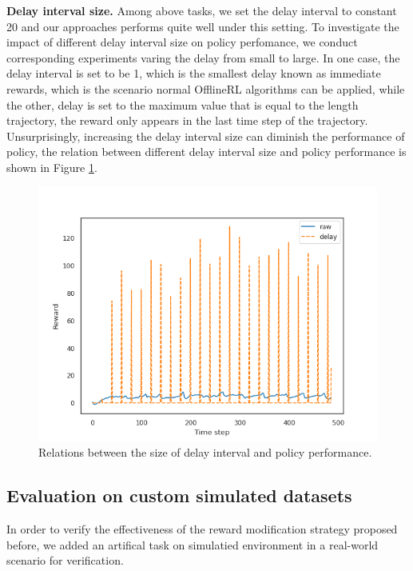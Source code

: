 \textbf{Delay interval size.} Among above tasks, we set the delay interval to constant 20 and our approaches
performs quite well under this setting. To investigate the impact of different delay interval size on policy perfomance, we 
conduct corresponding experiments varing the delay from small to large. In one case, the delay 
interval is set to be 1, which is the smallest delay known as immediate rewards, which is the scenario 
normal OfflineRL algorithms can be applied, while the other, delay is set to the maximum value
that is equal to the length trajectory, the reward only appears in the last time step of the trajectory. Unsurprisingly,
increasing the delay interval size can diminish the performance of policy, the relation between different delay 
interval size and policy performance is shown in Figure \ref{fig:fig2}.

\begin{figure}[H]
    \centering
    \includegraphics[width=\textwidth]{assets/delay_mode-constant-delay-20_0_delayed.png}
    
    \caption{Relations between the size of delay interval and policy performance.}
    \label{fig:fig2}
\end{figure}

\subsection{Evaluation on custom simulated datasets}

In order to verify the effectiveness of the reward modification strategy proposed before, we added an artifical task on simulatied environment 
in a real-world scenario for verification.

